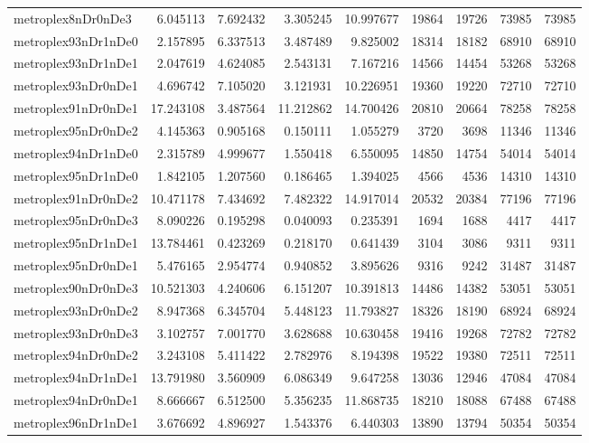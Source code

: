 \begin{longtable}{|l|r|r|r|r|r|r|r|r|}
metroplex8nDr0nDe3 & 6.045113 & 7.692432 & 3.305245 & 10.997677 & 19864 & 19726 & 73985 & 73985 \\
metroplex93nDr1nDe0 & 2.157895 & 6.337513 & 3.487489 & 9.825002 & 18314 & 18182 & 68910 & 68910 \\
metroplex93nDr1nDe1 & 2.047619 & 4.624085 & 2.543131 & 7.167216 & 14566 & 14454 & 53268 & 53268 \\
metroplex93nDr0nDe1 & 4.696742 & 7.105020 & 3.121931 & 10.226951 & 19360 & 19220 & 72710 & 72710 \\
metroplex91nDr0nDe1 & 17.243108 & 3.487564 & 11.212862 & 14.700426 & 20810 & 20664 & 78258 & 78258 \\
metroplex95nDr0nDe2 & 4.145363 & 0.905168 & 0.150111 & 1.055279 & 3720 & 3698 & 11346 & 11346 \\
metroplex94nDr1nDe0 & 2.315789 & 4.999677 & 1.550418 & 6.550095 & 14850 & 14754 & 54014 & 54014 \\
metroplex95nDr1nDe0 & 1.842105 & 1.207560 & 0.186465 & 1.394025 & 4566 & 4536 & 14310 & 14310 \\
metroplex91nDr0nDe2 & 10.471178 & 7.434692 & 7.482322 & 14.917014 & 20532 & 20384 & 77196 & 77196 \\
metroplex95nDr0nDe3 & 8.090226 & 0.195298 & 0.040093 & 0.235391 & 1694 & 1688 & 4417 & 4417 \\
metroplex95nDr1nDe1 & 13.784461 & 0.423269 & 0.218170 & 0.641439 & 3104 & 3086 & 9311 & 9311 \\
metroplex95nDr0nDe1 & 5.476165 & 2.954774 & 0.940852 & 3.895626 & 9316 & 9242 & 31487 & 31487 \\
metroplex90nDr0nDe3 & 10.521303 & 4.240606 & 6.151207 & 10.391813 & 14486 & 14382 & 53051 & 53051 \\
metroplex93nDr0nDe2 & 8.947368 & 6.345704 & 5.448123 & 11.793827 & 18326 & 18190 & 68924 & 68924 \\
metroplex93nDr0nDe3 & 3.102757 & 7.001770 & 3.628688 & 10.630458 & 19416 & 19268 & 72782 & 72782 \\
metroplex94nDr0nDe2 & 3.243108 & 5.411422 & 2.782976 & 8.194398 & 19522 & 19380 & 72511 & 72511 \\
metroplex94nDr1nDe1 & 13.791980 & 3.560909 & 6.086349 & 9.647258 & 13036 & 12946 & 47084 & 47084 \\
metroplex94nDr0nDe1 & 8.666667 & 6.512500 & 5.356235 & 11.868735 & 18210 & 18088 & 67488 & 67488 \\
metroplex96nDr1nDe1 & 3.676692 & 4.896927 & 1.543376 & 6.440303 & 13890 & 13794 & 50354 & 50354 \\

\end{longtable}
